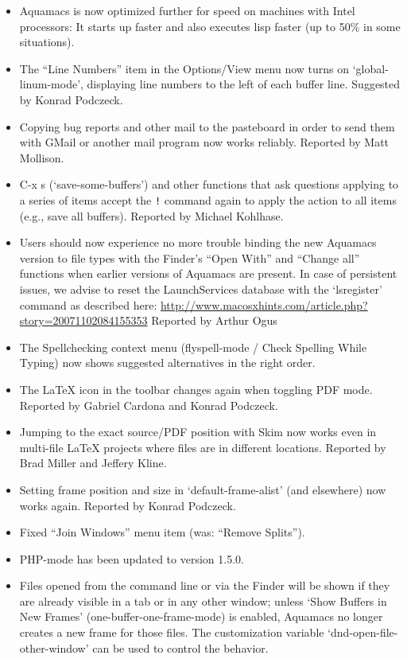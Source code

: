 \begin{itemize}


\item Aquamacs is now optimized further for speed on machines with Intel processors: It starts up faster and also executes lisp faster (up to 50\% in some situations).
\item The ``Line Numbers'' item in the Options/View menu now turns on `global-linum-mode', displaying line numbers to the left of each buffer line.
Suggested by Konrad Podczeck.
\item Copying bug reports and other mail to the pasteboard in order to send them with GMail or another mail program now works reliably.
Reported by Matt Mollison. %
\item C-x s (`save-some-buffers') and other functions that ask questions applying to a series of items accept the {\tt !} command again to apply the action to all items (e.g., save all buffers).
Reported by Michael Kohlhase.
\item Users should now experience no more trouble binding the new Aquamacs version to file types with the Finder's ``Open With'' and ``Change all'' functions when earlier versions of Aquamacs are present.  In case of persistent issues, we advise to reset the LaunchServices database with the `lsregister' command as described here:  \url{http://www.macosxhints.com/article.php?story=20071102084155353}
Reported by Arthur Ogus
\item The Spellchecking context menu (flyspell-mode / Check Spelling While Typing) now shows suggested alternatives in the right order.
\item The LaTeX icon in the toolbar changes again when toggling PDF mode.
Reported by Gabriel Cardona and Konrad Podczeck.
\item Jumping to the exact source/PDF position with Skim now works even in multi-file LaTeX projects where files are in different locations.
Reported by Brad Miller and Jeffery Kline.
\item Setting frame position and size in `default-frame-alist' (and elsewhere) now works again.
Reported by Konrad Podczeck.
\item Fixed ``Join Windows'' menu item (was: ``Remove Splits'').
\item PHP-mode has been updated to version 1.5.0.
\item Files opened from the command line or via the Finder will be shown if they are already visible in a tab or in any other window;  unless `Show Buffers in New Frames' (one-buffer-one-frame-mode) is enabled, Aquamacs no longer creates a new frame for those files.  The customization variable `dnd-open-file-other-window'  can be used to control the behavior.

\end{itemize}

